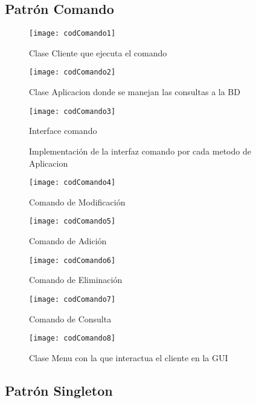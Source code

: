 \subsection{Patrón Comando}
\begin{figure}[H]
	\centering
	\texttt{[image: codComando1]}
	\centering
	\caption{Clase Cliente que ejecuta el comando}
	\label{fig:codComando1}
\end{figure}
\clearpage
\begin{figure}[H]
	\centering
	\texttt{[image: codComando2]}
	\centering
	\caption{Clase Aplicacion donde se manejan las consultas a la BD}
	\label{fig:codComando2}
\end{figure}
\begin{figure}[H]
	\centering
	\texttt{[image: codComando3]}
	\centering
	\caption{Interface comando}
	\label{fig:codComando3}
\end{figure}
\begin{figure}[H]
	\centering
	\caption{Implementación de la interfaz comando por cada metodo de Aplicacion}
	\texttt{[image: codComando4]}
	\caption{Comando de Modificación}
	\centering
	\label{fig:codComando4}
\end{figure}
\begin{figure}[H]
	\centering
	\texttt{[image: codComando5]}
	\centering
	\caption{Comando de Adición}
	\label{fig:codComando5}
\end{figure}
\begin{figure}[H]
	\centering
	\texttt{[image: codComando6]}
	\centering
	\caption{Comando de Eliminación}
	\label{fig:codComando6}
\end{figure}
\begin{figure}[H]
	\centering
	\texttt{[image: codComando7]}
	\centering
	\caption{Comando de Consulta}
	\label{fig:codComando7}
\end{figure}
\begin{figure}[H]
	\centering
	\texttt{[image: codComando8]}
	\centering
	\caption{Clase Menu con la que interactua el cliente en la GUI}
	\label{fig:codComando8}
\end{figure}

\subsection{Patrón Singleton}

